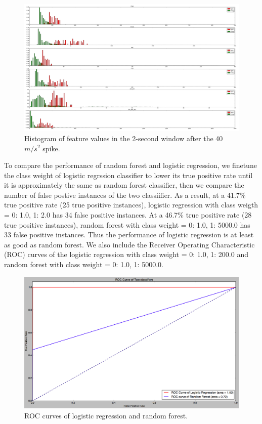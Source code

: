 \documentclass{soups}
\begin{document}
\begin{figure}[t]
\begin{center}
\includegraphics[width=\textwidth]{hist_features_after_win_size_1_2.png}
\end{center}
\caption{Histogram of feature values in the 2-second window after the 40 $m/s^2$ spike.}
\label{fig:afterhist}
\end{figure}

To compare the performance of random forest and logistic regression, we finetune the class weight of logistic regrssion classifier to lower its true positive rate until it is approximately the same as random forest classifier, then we compare the number of false postive instances of the two classiifier. 
As a result, at a 41.7\% true positive rate (25 true positive instances), logistic regression with class weigth = {0: 1.0, 1: 2.0} has 34 false positive instances. 
At a 46.7\% true positive rate (28 true positive instances), random forest with class weight = {0: 1.0, 1: 5000.0} has 33 false positive instances. 
Thus the performance of logistic regression is at least as good as random forest.
We also include the Receiver Operating Characteristic (ROC) curves of the logistic regression with class weight = {0: 1.0, 1: 200.0} and random forest with class weight = {0: 1.0, 1: 5000.0}. 

\begin{figure}[H]
\begin{center}
\includegraphics[width=1.0\columnwidth]{roc_curves.png}
\end{center}
\caption{ROC curves of logistic regression and random forest.}
\end{figure}
\end{document}
